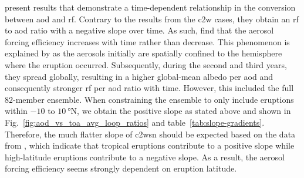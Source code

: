 \documentclass{ametsocV6.1}
\begin{document}
\citet[][their Fig.\ 1c,d]{marshall2020} present results that demonstrate a
time-dependent relationship in the conversion between \gls{aod} and \gls{rf}. Contrary
to the results from the \gls{c2w} cases, they obtain an \gls{rf} to \gls{aod} ratio with
a negative slope over time. As such, \citet{marshall2020} find that the aerosol forcing
efficiency increases with time rather than decrease. This phenomenon is explained by
\citet{marshall2020} as the aerosols initially are spatially confined to the hemisphere
where the eruption occurred. Subsequently, during the second and third years, they
spread globally, resulting in a higher global-mean albedo per \gls{aod} and consequently
stronger \gls{rf} per \gls{aod} ratio with time. However, this included the full
\(82\)-member ensemble. When constraining the ensemble to only include eruptions within
\(-10\) to \(\SI{10}{\degree\mathrm{N}}\), we obtain the positive slope as stated above
and shown in Fig.~\ref{fig:aod_vs_toa_avg_loop_ratios} and
table~\ref{tab:slope-gradients}. Therefore, the much flatter slope of \gls{c2wsn} should
be expected based on the data from \citet{marshall2020}, which indicate that tropical
eruptions contribute to a positive slope while high-latitude eruptions contribute to a
negative slope. As a result, the aerosol forcing efficiency seems strongly dependent on
eruption latitude.
\end{document}
